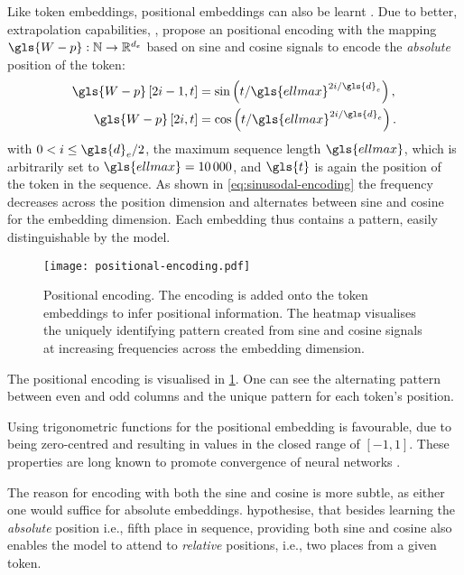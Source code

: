 Like \gls{token} embeddings, positional embeddings can also be learnt \autocite[cp.][4174]{devlinBERTPretrainingDeep2019}. Due to better, extrapolation capabilities, \textcite[][6]{vaswaniAttentionAllYou2017}, propose an positional encoding with the mapping $\gls{W-p}: \mathbb{N} \rightarrow \mathbb{R}^{d_{e}}$ based on sine and cosine signals to encode the \emph{absolute} position of the \gls{token}:
\begin{equation}
    \begin{aligned}
        \gls{W-p}\left[2 i-1, t\right] & =\sin \left(t / \gls{ellmax}^{2 i / \gls{d}_e}\right), \\
        \gls{W-p}\left[2 i, t\right]   & =\cos \left(t / \gls{ellmax}^{2 i / \gls{d}_e}\right).
    \end{aligned}
    \label{eq:sinusodal-encoding}
\end{equation}
with $0<i \leq \gls{d}_{e} / 2$, the maximum sequence length $\gls{ellmax}$, which is arbitrarily set to $\gls{ellmax}=\num{10000}$, and $\gls{t}$ is again the position of the \gls{token} in the sequence. As shown in \cref{eq:sinusodal-encoding} the frequency decreases across the position dimension and alternates between sine and cosine for the embedding dimension. Each embedding thus contains a pattern, easily distinguishable by the model.

\begin{figure}[ht]
    \centering
    \texttt{[image: positional-encoding.pdf]}
    \caption[Positional Encoding of Transformer]{Positional encoding. The encoding is added onto the \gls{token} embeddings to infer positional information. The heatmap visualises the uniquely identifying pattern created from sine and cosine signals at increasing frequencies across the embedding dimension.}
    \label{fig:positional-embedding}
\end{figure}

The positional encoding is visualised in \cref{fig:positional-embedding}. One can see the alternating pattern between even and odd columns and the unique pattern for each \gls{token}'s position.

Using trigonometric functions for the positional embedding is favourable, due to being zero-centred and resulting in values in the closed range of $[-1,1]$. These properties are long known to promote convergence of neural networks \autocites[][8-9]{lecunEfficientBackProp2012}[][2]{ioffeBatchNormalizationAccelerating2015}.

The reason for encoding with both the sine and cosine is more subtle, as either one would suffice for absolute embeddings. \textcite[][6]{vaswaniAttentionAllYou2017} hypothesise, that besides learning the \emph{absolute} position i.e., fifth place in sequence, providing both sine and cosine also enables the model to attend to \emph{relative} positions, i.e., two places from a given \gls{token}.

